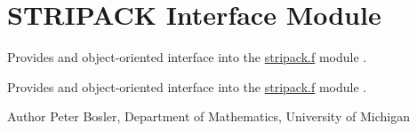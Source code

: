 \hypertarget{group___s_t_r_i_p_a_c_k_interface}{\section{S\+T\+R\+I\+P\+A\+C\+K Interface Module}
\label{group___s_t_r_i_p_a_c_k_interface}
}


Provides and object-\/oriented interface into the \hyperlink{stripack_8f_source}{stripack.\+f} module \cite{STRIPACK} .  


Provides and object-\/oriented interface into the \hyperlink{stripack_8f_source}{stripack.\+f} module \cite{STRIPACK} . 

\begin{DoxyAuthor}{Author}
Peter Bosler, Department of Mathematics, University of Michigan 
\end{DoxyAuthor}
